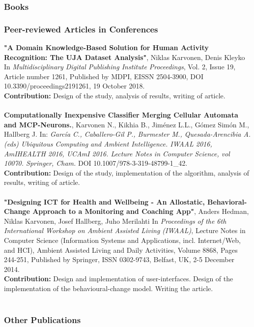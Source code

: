 \documentclass{article}
\begin{document}
\subsubsection{Books}

\subsubsection{Peer-reviewed Articles in Conferences}
\textbf{ "A Domain Knowledge-Based Solution for Human Activity Recognition: The UJA Dataset Analysis"},
Niklas Karvonen, Denis Kleyko
In \textit{ Multidisciplinary Digital Publishing Institute Proceedings}, Vol. 2, Issue 19, Article number 1261, 
Published by MDPI, EISSN 2504-3900, 
DOI 10.3390/proceedings2191261, 
19 October 2018.\\
\textbf{Contribution:} Design of the study, analysis of results, writing of article.
\\ \\


\textbf{Computationally Inexpensive Classifier Merging Cellular Automata and MCP-Neurons.},
Karvonen N., Kikhia B., Jiménez L.L., Gómez Simón M., Hallberg J.
In: \textit{García C., Caballero-Gil P., Burmester M., Quesada-Arencibia A. (eds) Ubiquitous Computing and Ambient Intelligence. IWAAL 2016, AmIHEALTH 2016, UCAmI 2016. Lecture Notes in Computer Science, vol 10070. Springer, Cham.}
DOI 10.1007/978-3-319-48799-1\_42.\\
\textbf{Contribution:} Design of the study, implementation of the algorithm, analysis of results, writing of article.
\\ \\

\textbf{ "Designing ICT for Health and Wellbeing - An Allostatic, Behavioral-Change Approach to a Monitoring and Coaching App"}, 
Anders Hedman, Niklas Karvonen, Josef Hallberg, Juho Merilahti
In \textit{Proceedings of the 6th International Workshop on Ambient Assisted Living (IWAAL)}, Lecture Notes in Computer Science (Information Systems and Applications, incl. Internet/Web, and HCI), Ambient Assisted Living and Daily Activities, Volume 8868, Pages 244-251, 
Published by Springer, ISSN 0302-9743, Belfast, UK, 
2-5 December 2014.\\
\textbf{Contribution:} Design and implementation of user-interfaces. Design of the implementation of the behavioural-change model. Writing the article.
\\ \\

\subsubsection{Other Publications}
\newpage
\end{document}
